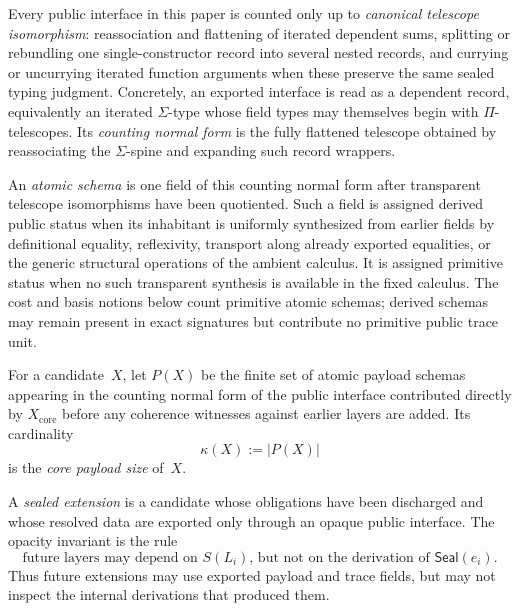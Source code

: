 \documentclass{lmcs}
\begin{document}
\begin{defi}
\label{def:atomic-schema}
Every public interface in this paper is counted only up to \emph{canonical telescope isomorphism}: reassociation and flattening of iterated dependent sums, splitting or rebundling one single-constructor record into several nested records, and currying or uncurrying iterated function arguments when these preserve the same sealed typing judgment. Concretely, an exported interface is read as a dependent record, equivalently an iterated $\Sigma$-type whose field types may themselves begin with $\Pi$-telescopes. Its \emph{counting normal form} is the fully flattened telescope obtained by reassociating the $\Sigma$-spine and expanding such record wrappers.

An \emph{atomic schema} is one field of this counting normal form after transparent telescope isomorphisms have been quotiented. Such a field is assigned derived public status when its inhabitant is uniformly synthesized from earlier fields by definitional equality, reflexivity, transport along already exported equalities, or the generic structural operations of the ambient calculus. It is assigned primitive status when no such transparent synthesis is available in the fixed calculus. The cost and basis notions below count primitive atomic schemas; derived schemas may remain present in exact signatures but contribute no primitive public trace unit.
\end{defi}

\begin{defi}
\label{def:payload}
For a candidate~$X$, let $P(X)$ be the finite set of atomic payload schemas appearing in the counting normal form of the public interface contributed directly by $X_{\mathrm{core}}$ before any coherence witnesses against earlier layers are added. Its cardinality
\[
  \kappa(X) := |P(X)|
\]
is the \emph{core payload size} of~$X$.
\end{defi}

\begin{defi}
\label{def:sealed}
A \emph{sealed extension} is a candidate whose obligations have been discharged and whose resolved data are exported only through an opaque public interface. The opacity invariant is the rule
\[
  \text{future layers may depend on } S(L_i) \text{, but not on the derivation of } \mathsf{Seal}(e_i).
\]
Thus future extensions may use exported payload and trace fields, but may not inspect the internal derivations that produced them.
\end{defi}
\end{document}
